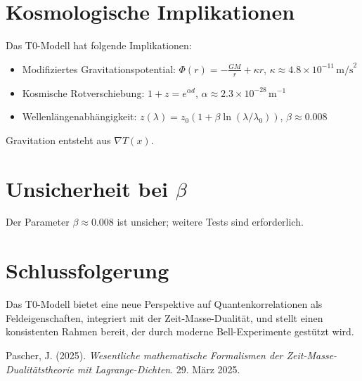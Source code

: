 \documentclass[a4paper,12pt]{article}
\newcommand{\Tfield}{T(x)}
\begin{document}
	\section{Kosmologische Implikationen}
	Das T0-Modell hat folgende Implikationen:
	\begin{itemize}
		\item Modifiziertes Gravitationspotential: \( \Phi(r) = -\frac{GM}{r} + \kappa r \), \( \kappa \approx 4.8 \times 10^{-11} \, \text{m/s}^2 \)
		\item Kosmische Rotverschiebung: \( 1 + z = e^{\alpha d} \), \( \alpha \approx 2.3 \times 10^{-28} \, \text{m}^{-1} \)
		\item Wellenlängenabhängigkeit: \( z(\lambda) = z_0 (1 + \beta \ln(\lambda/\lambda_0)) \), \( \beta \approx 0.008 \)
	\end{itemize}
	Gravitation entsteht aus \( \nabla \Tfield \).
	
	\section{Unsicherheit bei \(\beta\)}
	Der Parameter \( \beta \approx 0.008 \) ist unsicher; weitere Tests sind erforderlich.
	
	\section{Schlussfolgerung}
	Das T0-Modell bietet eine neue Perspektive auf Quantenkorrelationen als Feldeigenschaften, integriert mit der Zeit-Masse-Dualität, und stellt einen konsistenten Rahmen bereit, der durch moderne Bell-Experimente gestützt wird.
	
	\begin{thebibliography}{9}
		 Pascher, J. (2025). \textit{Wesentliche mathematische Formalismen der Zeit-Masse-Dualitätstheorie mit Lagrange-Dichten}. 29. März 2025.
	\end{thebibliography}
	
\end{document}
